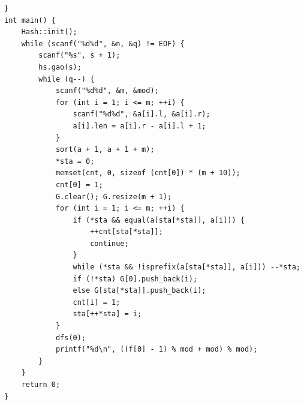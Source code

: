 \begin{lstlisting}
}
int main() {
	Hash::init();
	while (scanf("%d%d", &n, &q) != EOF) {
		scanf("%s", s + 1);
		hs.gao(s);
		while (q--) {
			scanf("%d%d", &m, &mod);
			for (int i = 1; i <= m; ++i) {
				scanf("%d%d", &a[i].l, &a[i].r);
				a[i].len = a[i].r - a[i].l + 1;
			}
			sort(a + 1, a + 1 + m);
			*sta = 0;
			memset(cnt, 0, sizeof (cnt[0]) * (m + 10));
			cnt[0] = 1;
			G.clear(); G.resize(m + 1);
			for (int i = 1; i <= m; ++i) {
				if (*sta && equal(a[sta[*sta]], a[i])) {
					++cnt[sta[*sta]];
					continue;
				}
				while (*sta && !isprefix(a[sta[*sta]], a[i])) --*sta;
				if (!*sta) G[0].push_back(i);
				else G[sta[*sta]].push_back(i);
				cnt[i] = 1;
				sta[++*sta] = i; 
			}
			dfs(0);
			printf("%d\n", ((f[0] - 1) % mod + mod) % mod); 
		}
	}
	return 0;
}
\end{lstlisting}


